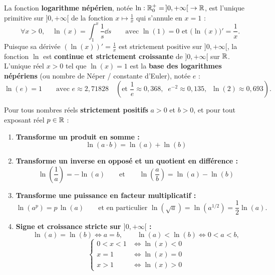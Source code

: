 \begin{definition}
La fonction \textbf{logarithme népérien}, notée $\ln : \mathbb{R}_0^+ = \,]0, +\infty[ \;\to \mathbb{R}$, est l'unique primitive sur $]0, +\infty[$ de la fonction $x \mapsto \frac{1}{x}$ qui s'annule en $x = 1$ :
\[
    \boxed{\forall x > 0, \quad \ln(x) = \int_1^x \frac{1}{s}\dd s \qquad \text{avec } \ln(1) = 0 \text{ et } \bigl(\ln(x)\bigr)' = \frac{1}{x}}.
\]
Puisque sa dérivée $(\ln(x))' = \frac{1}{x}$ est strictement positive sur $]0, +\infty[$, la fonction $\ln$ est \textbf{continue et strictement croissante} de $]0, +\infty[$ sur $\mathbb{R}$.
L'unique réel $x > 0$ tel que $\ln(x) = 1$ est la \textbf{base des logarithmes népériens} (ou nombre de Néper / constante d'Euler), notée $e$ :
\[
    \boxed{\ln(e) = 1 \qquad \text{avec } e \approx 2,71828 \quad \left(\text{et } \frac{1}{e} \approx 0,368,\;\; e^{-2} \approx 0,135,\;\; \ln(2) \approx 0,693\right)}.
\]
\end{definition}

\begin{theoreme}
Pour tous nombres réels \textbf{strictement positifs} $a > 0$ et $b > 0$, et pour tout exposant réel $p \in \mathbb{R}$ :
\begin{enumerate}
    \item \textbf{Transforme un produit en somme :}
    \[
        \boxed{\ln(a \cdot b) = \ln(a) + \ln(b)}
    \]
    \item \textbf{Transforme un inverse en opposé et un quotient en différence :}
    \[
        \boxed{\ln\left(\frac{1}{a}\right) = -\ln(a)} \qquad \text{et} \qquad \boxed{\ln\left(\frac{a}{b}\right) = \ln(a) - \ln(b)}
    \]
    \item \textbf{Transforme une puissance en facteur multiplicatif :}
    \[
        \boxed{\ln(a^p) = p\,\ln(a)} \qquad \text{et en particulier } \ln(\sqrt{a}) = \ln(a^{1/2}) = \frac{1}{2}\ln(a).
    \]
    \item \textbf{Signe et croissance stricte sur $]0, +\infty[$ :}
    \[
        \ln(a) = \ln(b) \iff a = b, \qquad \ln(a) < \ln(b) \iff 0 < a < b,
    \]
    \[
        \boxed{\begin{cases} 0 < x < 1 &\iff \ln(x) < 0 \\ x = 1 &\iff \ln(x) = 0 \\ x > 1 &\iff \ln(x) > 0 \end{cases}}
    \]
\end{enumerate}
\end{theoreme}

